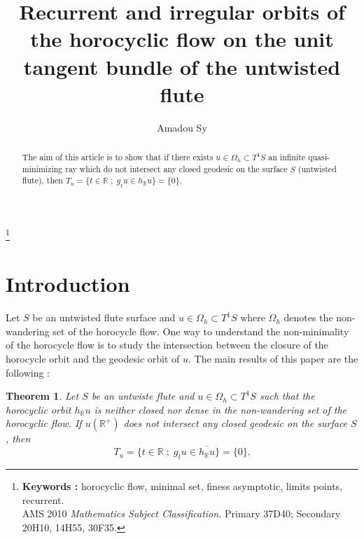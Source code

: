 \documentclass[11pt]{amsart}
\newtheorem{thm}{Theorem}[section]
\begin{document}
\title[Recurrent and irregular orbits of the horocyclic flow on the unit tangent bundle of the untwisted flute]{Recurrent and irregular orbits of the horocyclic flow on the unit tangent bundle of the untwisted flute} 



\author[Amadou Sy]{Amadou Sy}
\address{Department of mathematics and computer science at the Cheikh Anta Diop University of Dakar (Senegal)}

\begin{abstract}
The aim of this article is to show that if there exists  \( u \in \Omega_{h} \subset T^{1}S \) an infinite quasi-minimizing ray which do not intersect any closed geodesic on the surface $S$ (untwisted flute), then
$T_{u}=\{ t \in \mathbb{R} \; ; \; g_{t}u \in \overline{h_{\mathbb{R}}u} \}=\{0\}.
$





\end{abstract}
\footnote{\textbf{Keywords :} horocyclic flow, minimal set, finess asymptotic, limits points, recurrent.\\
AMS 2010 \textit{Mathematics Subject Classification.} Primary 37D40; Secondary 20H10, 14H55, 30F35.}

\maketitle
\section{Introduction}
Let $S$ be an untwisted flute surface and $
u \in \Omega_{h} \subset T^{1}S$ where $\Omega_{h}$ denotes the non-wandering set of the horocycle flow. 
One way to understand the non-minimality of the horocycle flow is to study the intersection 
between the closure of the horocycle orbit and the geodesic orbit of $u$. 
The main results of this paper are the following :

\begin{thm}\label{pa}
Let \( S\) be an untwiste flute and \( u \in \Omega_{h} \subset T^{1}S \) such that the horocyclic orbit \( h_{\mathbb{R}}u \) is neither closed nor dense in the non-wandering set of the horocyclic flow.  
If $u(\mathbb{R^{+}})$ does not intersect any closed  geodesic on the surface $S$, then  
$$
T_{u} = \{ t \in \mathbb{R} \; ; \; g_{t}u \in \overline{h_{\mathbb{R}}u} \} = \{0\}.
$$
\end{thm}
\end{document}
